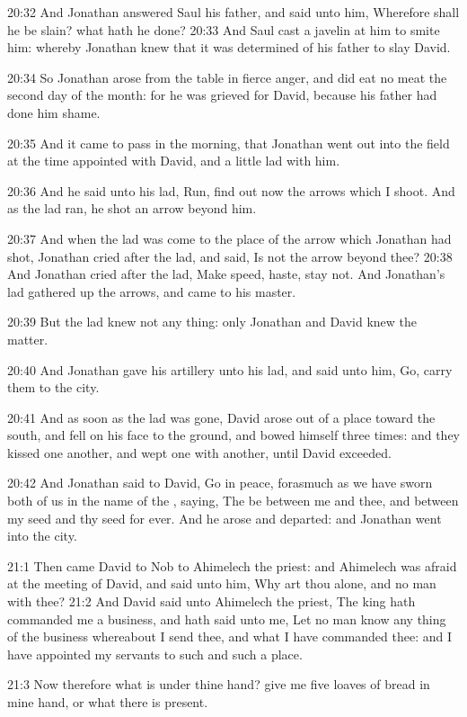 20:32 And Jonathan answered Saul his father, and said unto him,
Wherefore shall he be slain? what hath he done?  20:33 And Saul cast a
javelin at him to smite him: whereby Jonathan knew that it was
determined of his father to slay David.

20:34 So Jonathan arose from the table in fierce anger, and did eat no
meat the second day of the month: for he was grieved for David,
because his father had done him shame.

20:35 And it came to pass in the morning, that Jonathan went out into
the field at the time appointed with David, and a little lad with him.

20:36 And he said unto his lad, Run, find out now the arrows which I
shoot. And as the lad ran, he shot an arrow beyond him.

20:37 And when the lad was come to the place of the arrow which
Jonathan had shot, Jonathan cried after the lad, and said, Is not the
arrow beyond thee?  20:38 And Jonathan cried after the lad, Make
speed, haste, stay not. And Jonathan's lad gathered up the arrows, and
came to his master.

20:39 But the lad knew not any thing: only Jonathan and David knew the
matter.

20:40 And Jonathan gave his artillery unto his lad, and said unto him,
Go, carry them to the city.

20:41 And as soon as the lad was gone, David arose out of a place
toward the south, and fell on his face to the ground, and bowed
himself three times: and they kissed one another, and wept one with
another, until David exceeded.

20:42 And Jonathan said to David, Go in peace, forasmuch as we have
sworn both of us in the name of the \LORD, saying, The \LORD be between
me and thee, and between my seed and thy seed for ever. And he arose
and departed: and Jonathan went into the city.

21:1 Then came David to Nob to Ahimelech the priest: and Ahimelech was
afraid at the meeting of David, and said unto him, Why art thou alone,
and no man with thee?  21:2 And David said unto Ahimelech the priest,
The king hath commanded me a business, and hath said unto me, Let no
man know any thing of the business whereabout I send thee, and what I
have commanded thee: and I have appointed my servants to such and such
a place.

21:3 Now therefore what is under thine hand? give me five loaves of
bread in mine hand, or what there is present.

